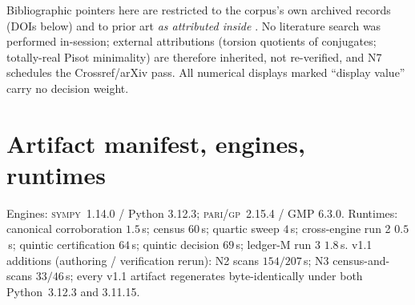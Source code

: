 \documentclass[11pt]{article}
\newcommand{\gp}{\textsc{pari/gp}}
\newcommand{\sy}{\textsc{sympy}}
\theoremstyle{definition}
\begin{document}
Bibliographic pointers here are restricted to the corpus's own archived records
(DOIs below) and to prior art \emph{as attributed inside}
\cite[Rem.~7.20 and refs.~14--16]{relcharge}. No literature search was performed
in-session; external attributions (torsion quotients of conjugates; totally-real
Pisot minimality) are therefore inherited, not re-verified, and N7 schedules the
Crossref/arXiv pass. All numerical displays marked ``display value'' carry no
decision weight.

\appendix

\section{Artifact manifest, engines, runtimes}\label{app:manifest}

Engines: \sy~1.14.0 / Python 3.12.3; \gp~2.15.4 / GMP 6.3.0. Runtimes:
canonical corroboration $1.5$\,s; census $60$\,s; quartic sweep $4$\,s;
cross-engine run 2 $0.5$\,s; quintic certification $64$\,s; quintic decision
$69$\,s; ledger-M run 3 $1.8$\,s. v1.1 additions (authoring / verification
rerun): N2 scans $154/207$\,s; N3 census-and-scans $33/46$\,s; every v1.1
artifact regenerates byte-identically under both Python~3.12.3 and 3.11.15.
\end{document}
